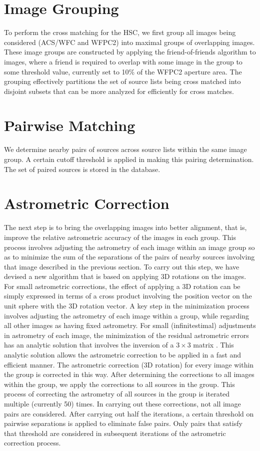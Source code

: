 \documentclass[11pt,twoside]{article}
\begin{document}
\section{Image Grouping}
To perform the cross matching for the HSC, we first group all images
being considered (ACS/WFC and WFPC2) into maximal groups of overlapping
images.  These image groups are constructed by applying the friend-of-friends
algorithm to images, where a friend is required to overlap with some image
in the group to some threshold value, currently set to 10\% of the WFPC2 aperture area.
The grouping effectively partitions the set of source lists being cross matched into
disjoint subsets that can be more analyzed for efficiently for cross matches.

\section{Pairwise Matching}

We determine nearby pairs of sources across source lists within the same image group.
A certain cutoff threshold is applied in making this pairing determination.
The set of paired sources is stored in the database.

\section{Astrometric Correction}

The next step is to bring the overlapping images into better alignment, that is,
improve the relative astrometric accuracy of the images in each group.
This process involves adjusting the astrometry of each
image within an image group so as to  minimize the sum of the separations of the
pairs of nearby sources involving that image described in the previous section.
To carry out this step, we have devised a new algorithm that is based
on applying 3D rotations on the images. 
For small astrometric corrections,
the effect of applying a 3D rotation can be simply expressed in terms
of a cross product involving the position vector on the unit sphere
with the 3D rotation vector. A key step in the minimization process involves adjusting
the astrometry of
each image within a group, while regarding all other images as having fixed astrometry.
For small (infinitestimal) adjustments in astrometry of each image, the minimization of the residual astrometric errors
has an analytic solution
that involves the inversion of a $3 \times 3$ matrix \cite{2012arXiv1206.0644B}. This analytic solution allows the astrometric correction to be applied
 in a fast and efficient manner. The astrometric correction (3D rotation)
for every image within the group is corrected in this way. After determining the corrections
to all images within the group, we apply the corrections  to all
sources in the group. This process of correcting the astrometry of all sources in the group
is iterated multiple (currently 50) times.
In carrying out these corrections, not all image pairs are considered. After carrying out
half the iterations, a certain threshold on pairwise separations %
is applied
to eliminate false pairs. Only pairs that satisfy that threshold are considered in  subsequent
iterations of the astrometric correction process.
\end{document}
